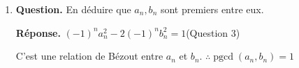 \documentclass[12pt, a4paper]{article}
\begin{document}
\begin{enumerate}[label=2.\arabic*., start=17]
\begin{minipage}[t]{\linewidth}
\begin{enumerate}[\arabic*.]
  \item \textbf{Question.} En déduire que $a_n,b_n$ sont premiers entre eux.
\par\smallskip
\textbf{Réponse.} $(-1)^n a_n^2 - 2(-1)^n b_n^2 = 1$\hfill(Question 3)

        C'est une relation de Bézout entre $a_n$ et $b_n$.
        $\therefore \operatorname{pgcd}(a_n,b_n) = 1$

\end{enumerate}
\end{minipage}

\end{enumerate}
\end{document}
